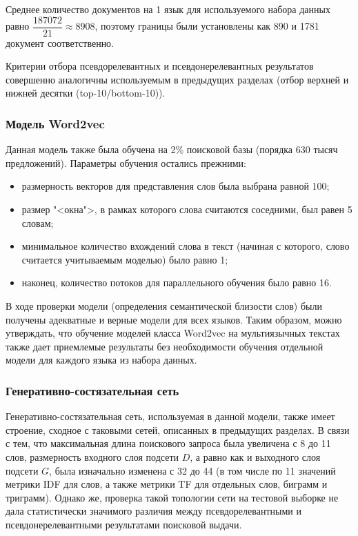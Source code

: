 Среднее количество документов на 1 язык для используемого набора данных равно $\dfrac{187072}{21}\approx8908$, поэтому границы были установлены как
890 и 1781 документ соответственно.

Критерии отбора псевдорелевантных и псевдонерелевантных результатов совершенно аналогичны используемым в предыдущих разделах (отбор верхней и нижней 
десятки (top-10/bottom-10)).

\subsubsection{Модель Word2vec}
Данная модель также была обучена на 2\% поисковой базы (порядка 630 тысяч предложений). Параметры обучения остались прежними:
\begin{itemize}
    \item размерность векторов для представления слов была выбрана равной 100;
    \item размер "<окна">, в рамках которого слова считаются соседними, был равен 5 словам;
    \item минимальное количество вхождений слова в текст (начиная с которого, слово считается учитываемым моделью) было равно 1;
    \item наконец, количество потоков для параллельного обучения было равно 16.
\end{itemize}

В ходе проверки модели (определения семантической близости слов) были получены адекватные и верные модели для всех языков. Таким образом, можно
утверждать, что обучение моделей класса Word2vec на мультиязычных текстах также дает приемлемые результаты без необходимости обучения отдельной
модели для каждого языка из набора данных.

\subsubsection{Генеративно-состязательная сеть}
Генеративно-состязательная сеть, используемая в данной модели, также имеет строение, сходное с таковыми сетей, описанных в предыдущих разделах.
В связи с тем, что максимальная длина поискового запроса была увеличена с 8 до 11 слов, размерность входного слоя подсети $D$, а равно как 
и выходного слоя подсети $G$, была изначально изменена с 32 до 44 (в том числе по 11 значений метрики IDF для слов, а также метрики TF
для отдельных слов, биграмм и триграмм). Однако же, проверка такой топологии сети на тестовой выборке не дала статистически значимого различия
между псевдорелевантными и псевдонерелевантными результатами поисковой выдачи.

